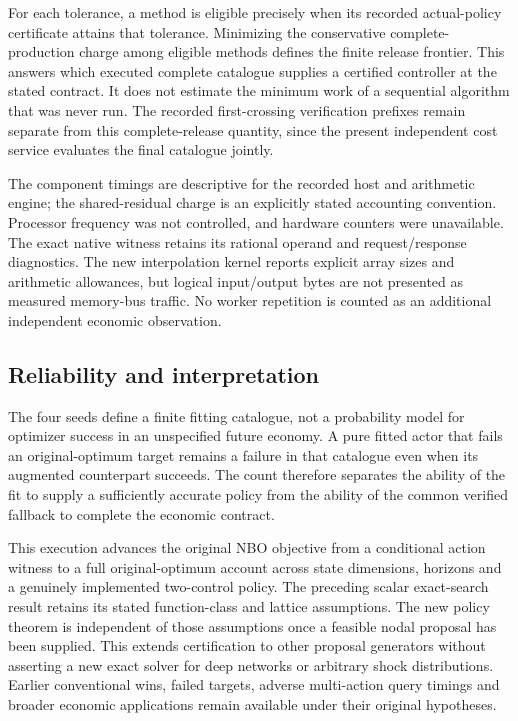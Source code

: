 For each tolerance, a method is eligible precisely when its recorded actual-policy certificate attains that tolerance. Minimizing the conservative complete-production charge among eligible methods defines the finite release frontier. This answers which executed complete catalogue supplies a certified controller at the stated contract. It does not estimate the minimum work of a sequential algorithm that was never run. The recorded first-crossing verification prefixes remain separate from this complete-release quantity, since the present independent cost service evaluates the final catalogue jointly.

The component timings are descriptive for the recorded host and arithmetic engine; the shared-residual charge is an explicitly stated accounting convention. Processor frequency was not controlled, and hardware counters were unavailable. The exact native witness retains its rational operand and request/response diagnostics. The new interpolation kernel reports explicit array sizes and arithmetic allowances, but logical input/output bytes are not presented as measured memory-bus traffic. No worker repetition is counted as an additional independent economic observation.

\subsection{Reliability and interpretation}
The four seeds define a finite fitting catalogue, not a probability model for optimizer success in an unspecified future economy. A pure fitted actor that fails an original-optimum target remains a failure in that catalogue even when its augmented counterpart succeeds. The count therefore separates the ability of the fit to supply a sufficiently accurate policy from the ability of the common verified fallback to complete the economic contract.

This execution advances the original NBO objective from a conditional action witness to a full original-optimum account across state dimensions, horizons and a genuinely implemented two-control policy. The preceding scalar exact-search result retains its stated function-class and lattice assumptions. The new policy theorem is independent of those assumptions once a feasible nodal proposal has been supplied. This extends certification to other proposal generators without asserting a new exact solver for deep networks or arbitrary shock distributions. Earlier conventional wins, failed targets, adverse multi-action query timings and broader economic applications remain available under their original hypotheses.
